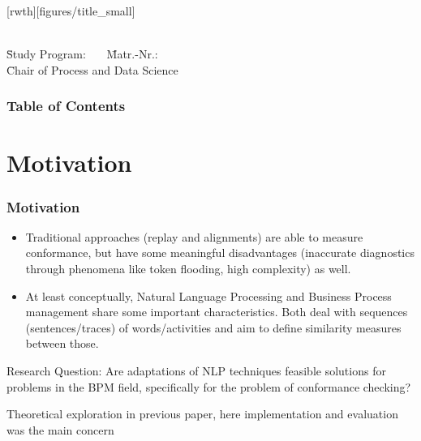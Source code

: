 \documentclass{beamer}
\author[\firstname]{\firstname~\lastname~\email}
\institute[RWTH]{RWTH Aachen University}
\begin{document}
	\beamertemplatenavigationsymbolsempty
[rwth][figures/title_small]{}
\begin{frame}[plain]
	\vspace{1cm}
	\titlepage
	
	\vspace{-6em}
	\parbox{0cm}{
		\begin{tabbing}
			\=\textbf{\firstname~\lastname}\=\\[0.4em]
			\=Study Program: \studyProgram~~~\=Matr.-Nr.:\matrNo\\[0.4em]
			\=Chair of Process and Data Science \=\\%
		\end{tabbing}
	}
\end{frame}
	\begin{frame}
		\frametitle{Table of Contents}
		\tableofcontents
	\end{frame}
	\section{Motivation}
	\begin{frame}
		\frametitle{Motivation}
		\begin{itemize}
			\item Traditional approaches (replay and alignments) are able to measure conformance, but have some meaningful disadvantages (inaccurate diagnostics through phenomena like token flooding, high complexity) as well.
			\item At least conceptually, Natural Language Processing and Business Process management share some important characteristics. Both deal with sequences (sentences/traces) of words/activities and aim to define similarity measures between those.
		\end{itemize}
		\begin{block}{Research Question:}
			Are adaptations of NLP techniques feasible solutions for problems in the BPM field, specifically for the problem of conformance checking?
		\end{block}
		\alert{Theoretical exploration in previous paper, here implementation and evaluation was the main concern}
	\end{frame}
\end{document}
